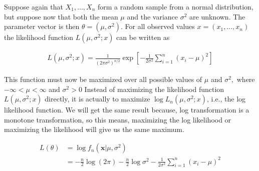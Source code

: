 \documentclass[ 11pt,%
				a4paper,%
				twoside,%
				headinclude,%
				footinclude = true,%
				cleardoublepage = empty,%
				reqno]{scrbook}
\begin{document}
\begin{example}
  Suppose again that $X_{1}, \ldots, X_{n}$ form a random sample from a normal distribution, but suppose now that both the mean $\mu$ and the variance $\sigma^{2}$ are unknown. The parameter vector is then $\theta=\left(\mu, \sigma^{2}\right)$. For all observed values $x = (x_{1}, \ldots, x_{n})$ the likelihood function $L\left(\mu, \sigma^{2};x\right)$ can be written as 

  \begin{align*}
    L\left(\mu, \sigma^{2};x\right) = \frac{1}{\left(2 \pi \sigma^{2}\right)^{n / 2}} \exp \left[-\frac{1}{2 \sigma^{2}} \sum_{i=1}^{n}\left(x_{i}-\mu\right)^{2}\right]
  \end{align*}


   This function must now be maximized over all possible values of $\mu$ and $\sigma^{2},$ where $-\infty<\mu<\infty$ and $\sigma^{2}>0$ Instead of maximizing the likelihood function $L\left(\mu, \sigma^{2};x\right)$ directly, it is actually to maximize $\log L_{n}\left(\mu, \sigma^{2};x\right)$, i.e., the log likelihood function. We will get the same result because, log transformation is a monotone transformation, so this means, maximizing the log likelihood or maximizing the likelihood will give us the same maximum.  

\begin{align*}
  L(\theta) &=\log f_{n}\left(\boldsymbol{x} | \mu, \sigma^{2}\right) \\
&=-\frac{n}{2} \log (2 \pi)-\frac{n}{2} \log \sigma^{2}-\frac{1}{2 \sigma^{2}} \sum_{i=1}^{n}\left(x_{i}-\mu\right)^{2}
\end{align*}


\end{example}
\end{document}
